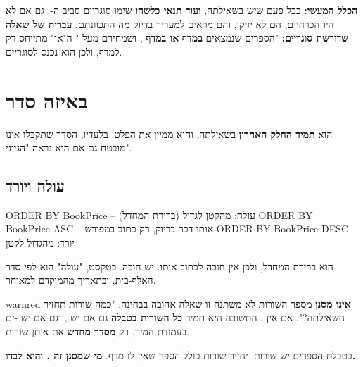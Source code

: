 \documentclass[11pt,a4paper]{article}
\begin{document}
\vspace{6pt}
\begin{panel}
\textbf{הכלל המעשי:} בכל פעם שיש  בשאילתה, \textbf{ועוד תנאי כלשהו} \textendash{} שימו סוגריים סביב ה-. גם אם לא היו הכרחיים, הם לא יזיקו, והם מראים למעריך בדיוק מה התכוונתם. \textbf{עברית של שאלה שדורשת סוגריים:} "הספרים שנמצאים \textbf{במדף}  \textbf{או במדף} , \textbf{ו}שמחירם מעל " \textendash{} ה"או" מתייחס רק למדף, ולכן הוא נכנס לסוגריים.
\end{panel}

\newpage
\section{ \textendash{} באיזה סדר}

 הוא \textbf{תמיד החלק האחרון} בשאילתה, והוא ממיין את הפלט. בלעדיו, הסדר שתקבלו אינו מובטח \textendash{} גם אם הוא נראה "הגיוני".

\subsection{עולה ויורד}

\begin{otherlanguage}{english}
\begin{sqlverb}
ORDER BY BookPrice           -- עולה: מהקטן לגדול   (ברירת המחדל)
ORDER BY BookPrice ASC       -- אותו דבר בדיוק, רק כתוב במפורש
ORDER BY BookPrice DESC      -- יורד: מהגדול לקטן
\end{sqlverb}
\end{otherlanguage}

{\small {} הוא ברירת המחדל, ולכן אין חובה לכתוב אותו.  \textendash{} יש חובה. בטקסט, "עולה" הוא לפי סדר האלף-בית, ובתאריך \textendash{} מהמוקדם למאוחר.}

\begin{notepanel}{warnred}{ \textbf{אינו מסנן} \textendash{} מספר השורות לא משתנה}
זו שאלה אהובה בבחינה: "כמה שורות תחזיר השאילתה?". אם אין , התשובה היא תמיד \textbf{כל השורות בטבלה} \textendash{} גם אם יש , וגם אם יש -ים בעמודת המיון.  רק \textbf{מסדר מחדש} את אותן שורות.

\vspace{3pt}
בטבלת הספרים יש  שורות.  יחזיר \textbf{} שורות \textendash{} כולל הספר שאין לו מדף. \textbf{מי שמסנן \textendash{} זה , והוא לבדו.}
\end{notepanel}
\end{document}
